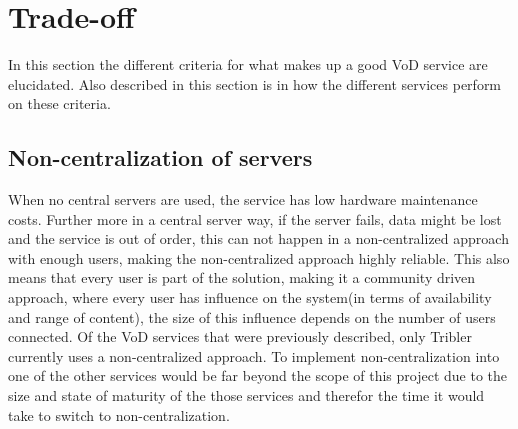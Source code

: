 \section{Trade-off}
In this section the different criteria for what makes up a good VoD service are elucidated. Also described in this section is in how the different services perform on these criteria.

\subsection{Non-centralization of servers}
\label{sec:central}
When no central servers are used, the service has low hardware maintenance costs. Further more in a central server way, if the server fails, data might be lost and the service is out of order, this can not happen in a non-centralized approach with enough users, making the non-centralized approach highly reliable. This also means that every user is part of the solution, making it a community driven approach, where every user has influence on the system(in terms of availability and range of content), the size of this influence depends on the number of users connected.
Of the VoD services that were previously described, only Tribler currently uses a non-centralized approach. To implement non-centralization into one of the other services would be far beyond the scope of this project due to the size and state of maturity of the those services and therefor the time it would take to switch to non-centralization. 
